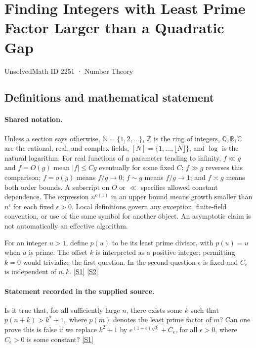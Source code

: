 \documentclass[11pt,a4paper]{article}
\newcommand{\N}{\mathbb{N}}
\newcommand{\Z}{\mathbb{Z}}
\newcommand{\Q}{\mathbb{Q}}
\newcommand{\R}{\mathbb{R}}
\newcommand{\C}{\mathbb{C}}
\newcommand{\sref}[2]{\hyperlink{source:#1:#2}{[S#2]}}
\begin{document}

\setcounter{section}{2250}

\section{Finding Integers with Least Prime Factor Larger than a Quadratic Gap}\label{2251}

{\small\sffamily UnsolvedMath ID 2251 · Number Theory}

\subsection{Definitions and mathematical statement}

\paragraph{Shared notation.}Unless a section says otherwise, $\N=\{1,2,\ldots\}$,
$\Z$ is the ring of integers, $\Q,\R,\C$ are the rational, real, and complex
fields, $[N]=\{1,\ldots,\lfloor N\rfloor\}$, and $\log$ is the natural
logarithm. For real functions of a parameter tending to infinity,
$f\ll g$ and $f=O(g)$ mean $|f|\leq Cg$ eventually for some fixed $C$;
$f\gg g$ reverses this comparison; $f=o(g)$ means $f/g\to0$;
$f\sim g$ means $f/g\to1$; and $f\asymp g$ means both order bounds.
A subscript on $O$ or $\ll$ specifies allowed constant dependence.
The expression $n^{o(1)}$ in an upper bound means growth smaller than
$n^\epsilon$ for each fixed $\epsilon>0$. Local definitions govern any
exception, finite-field convention, or use of the same symbol for another
object. An asymptotic claim is not automatically an effective algorithm.



For an integer $u>1$, define $p(u)$ to be its least prime divisor, with $p(u)=u$ when $u$ is prime. The offset $k$ is interpreted as a positive integer; permitting $k=0$ would trivialize the first question. In the second question $\epsilon$ is fixed and $C_\epsilon$ is independent of $n,k$. \sref{2251}{1} \sref{2251}{2}

\paragraph{Statement recorded in the supplied source.}
Is it true that, for all sufficiently large $n$, there exists some $k$ such that $ p(n+k)>k^2+1, $ where $p(m)$ denotes the least prime factor of $m$?
Can one prove this is false if we replace $k^2+1$ by $e^{(1+\epsilon)\sqrt{k}}+C_\epsilon$, for all $\epsilon>0$, where $C_\epsilon>0$ is some constant? \sref{2251}{1}
\end{document}
